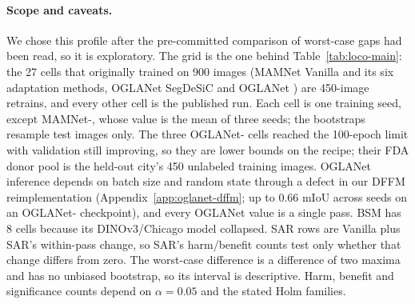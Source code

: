 \paragraph{Scope and caveats.} We chose this profile after the pre-committed comparison of
worst-case gaps had been read, so it is exploratory. The grid is the one behind
Table~\ref{tab:loco-main}: the 27 cells that originally trained on 900 images (MAMNet Vanilla
and its six adaptation methods, OGLANet SegDeSiC and OGLANet \sib{}) are 450-image retrains, and
every other cell is the published run. Each cell is one training seed, except MAMNet-\sib{},
whose value is the mean of three seeds; the bootstraps resample test images only. The three
OGLANet-\sib{} cells reached the 100-epoch limit with validation still improving, so they are
lower bounds on the recipe; their FDA donor pool is the held-out city's 450 unlabeled training
images. OGLANet inference depends on batch size and random state through a defect in our DFFM
reimplementation (Appendix~\ref{app:oglanet-dffm}; up to $0.66$ mIoU across seeds on an OGLANet-\sib{} checkpoint), and every
OGLANet value is a single pass. BSM has 8 cells because its DINOv3/Chicago model collapsed. SAR
rows are Vanilla plus SAR's within-pass change, so SAR's harm/benefit counts test only whether
that change differs from zero. The worst-case difference is a difference of two maxima and has no
unbiased bootstrap, so its interval is descriptive. Harm, benefit and significance counts depend
on $\alpha = 0.05$ and the stated Holm families.
